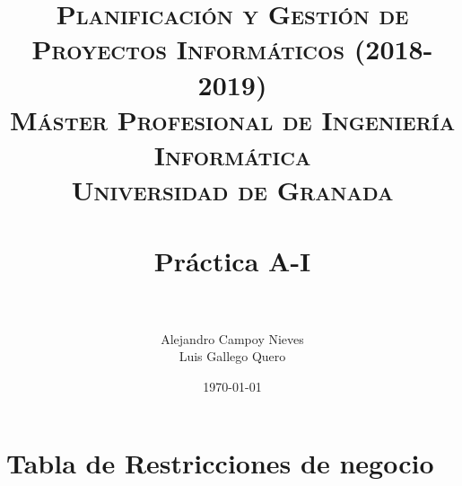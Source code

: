 

\title{	
	\normalfont \normalsize 
	\textsc{\textbf{Planificación y Gestión de Proyectos Informáticos (2018-2019)} \\ Máster Profesional de Ingeniería Informática \\ Universidad de Granada} \\ [25pt] %
	\horrule{0.5pt} \\[0.4cm] %
	\huge Práctica A-I \\ %
	\horrule{2pt} \\[0.5cm] %
}

\author{Alejandro Campoy Nieves \\ Luis Gallego Quero} %
\date{\normalsize\today} %

\usepackage[spanish, es-tabla]{babel}
\usepackage{hyperref} %
\hypersetup{
	colorlinks=true,
	linkcolor=blue,
	filecolor=magenta,      
	urlcolor=cyan,
}
\usepackage{graphicx}
\usepackage{amssymb, amsmath, amsbsy}
\usepackage{mathptmx}	
\usepackage{float}
\usepackage{booktabs}					%
\usepackage{eurosym}
\usepackage{xcolor}
\usepackage{colortbl}




	\maketitle %
	
	\newpage %
	
	\tableofcontents %
	
	\listoffigures
	
	\listoftables	
	
	\newpage	
 
\section{Tabla de Restricciones de negocio}


